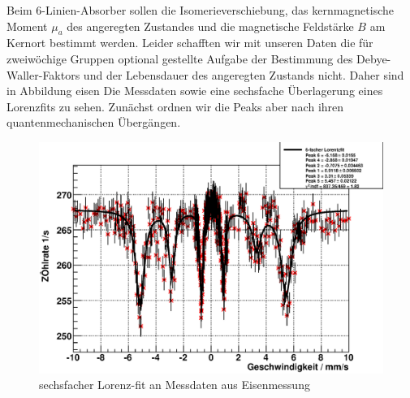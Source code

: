 \documentclass[12pt]{article}
\begin{document}
Beim 6-Linien-Absorber sollen die Isomerieverschiebung, das kernmagnetische Moment $\mu_a$ des angeregten Zustandes und die magnetische Feldstärke $B$
am Kernort bestimmt werden. Leider schafften wir mit unseren Daten die für zweiwöchige Gruppen optional gestellte Aufgabe der Bestimmung des
Debye-Waller-Faktors und der Lebensdauer des angeregten Zustands nicht. Daher sind in Abbildung \refname{eisen} Die Messdaten sowie eine sechsfache
Überlagerung eines Lorenzfits zu sehen. Zunächst ordnen wir die Peaks aber nach ihren quantenmechanischen Übergängen. 
\begin{figure}[H]
 \includegraphics[width=0.9\linewidth]{pictures/eisen.eps}
 \caption{sechsfacher Lorenz-fit an Messdaten aus Eisenmessung}
\end{figure}
\end{document}
